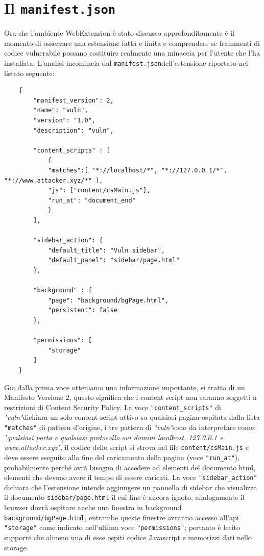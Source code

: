 \documentclass{sapthesis}
\newcommand{\code}[1]{\texttt{#1}}
\newcommand{\file}[1]{\code{#1}}
\newcommand{\vuln}{\textit{"vuln"}}
\newcommand{\JS}{Javascript }
\newcommand{\manifest}{\code{manifest.json}}
\begin{document}
    \section{Il \manifest}
    \label{sec:analisi-vuln-manifest}
        Ora che l'ambiente WebExtension è stato discusso approfonditamente è il momento di
        osservare una estensione fatta e finita e comprendere se frammenti di codice vulnerabile
        possano costituire realmente una minaccia per l'utente che l'ha installata.
        L'analisi incomincia dal \manifest dell'estensione riportato nel listato seguente:
        \begin{lstlisting}
    {
        "manifest_version": 2,
        "name": "vuln",
        "version": "1.0",
        "description": "vuln",

        "content_scripts" : [
            {
            "matches":[ "*://localhost/*", "*://127.0.0.1/*", "*://www.attacker.xyz/*" ],
            "js": ["content/csMain.js"],
            "run_at": "document_end"
            }
        ],

        "sidebar_action": {
            "default_title": "Vuln sidebar",
            "default_panel": "sidebar/page.html"
        },

        "background" : {
            "page": "background/bgPage.html",
            "persistent": false
        },

        "permissions": [
            "storage"
        ]
    }
        \end{lstlisting}
        Gia dalla prima voce otteniamo una informazione importante, si tratta di un Manifesto Versione 2,
        questo significa che i content script non saranno soggetti a restrizioni di Content Security Policy.
        La voce \code{"content\_scripts"} di \vuln dichiara un solo content script attivo su qualsiasi pagina ospitata dalla
        lista \code{"matches"} di pattern d'origine, i tre pattern di \vuln sono da interpretare come:
        \textit{"qualsiasi porta e qualsiasi protocollo sui domini localhost, 127.0.0.1 e www.attacker.xyz"},
        il codice dello script si strova nel file \file{content/csMain.js} e deve essere eseguito
        alla fine del caricamento della pagina (voce \code{"run\_at"}), probabilmente perché avrà bisogno
        di accedere ad elementi del documento html, elementi che devono avere il tempo di essere caricati.
        La voce \code{"sidebar\_action"} dichiara che l'estensione intende aggiungere un pannello di sidebar
        che visualizza il documento \file{sidebar/page.html} il cui fine è ancora ignoto, analogamente
        il browser dovrà ospitare anche una finestra in background \file{background/bgPage.html}, entrambe
        queste finestre avranno accesso all'api \code{"storage"} come indicato nell'ultima voce \code{"permissions"};
        pertanto è lecito supporre che almeno una di esse ospiti codice \JS e memorizzi dati nello storage.
        
\end{document}
